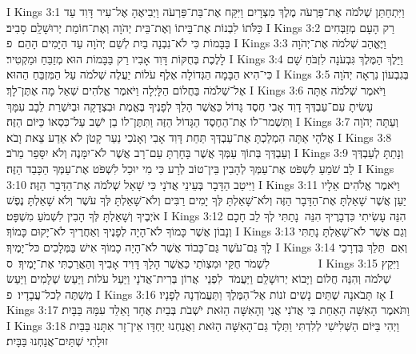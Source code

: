 I Kings 3:1	וַיִּתְחַתֵּן שְׁלֹמֹה אֶת־פַּרְעֹה מֶלֶךְ מִצְרָיִם וַיִּקַּח אֶת־בַּת־פַּרְעֹה וַיְבִיאֶהָ אֶל־עִיר דָּוִד עַד כַּלֹּתוֹ לִבְנוֹת אֶת־בֵּיתוֹ וְאֶת־בֵּית יְהֹוָה וְאֶת־חוֹמַת יְרוּשָׁלַ͏ִם סָבִיב׃
I Kings 3:2	רַק הָעָם מְזַבְּחִים בַּבָּמוֹת כִּי לֹא־נִבְנָה בַיִת לְשֵׁם יְהֹוָה עַד הַיָּמִים הָהֵם׃ {פ}
I Kings 3:3	וַיֶּאֱהַב שְׁלֹמֹה אֶת־יְהֹוָה לָלֶכֶת בְּחֻקּוֹת דָּוִד אָבִיו רַק בַּבָּמוֹת הוּא מְזַבֵּחַ וּמַקְטִיר׃
I Kings 3:4	וַיֵּלֶךְ הַמֶּלֶךְ גִּבְעֹנָה לִזְבֹּחַ שָׁם כִּי־הִיא הַבָּמָה הַגְּדוֹלָה אֶלֶף עֹלוֹת יַעֲלֶה שְׁלֹמֹה עַל הַמִּזְבֵּחַ הַהוּא׃
I Kings 3:5	בְּגִבְעוֹן נִרְאָה יְהֹוָה אֶל־שְׁלֹמֹה בַּחֲלוֹם הַלָּיְלָה וַיֹּאמֶר אֱלֹהִים שְׁאַל מָה אֶתֶּן־לָךְ׃
I Kings 3:6	וַיֹּאמֶר שְׁלֹמֹה אַתָּה עָשִׂיתָ עִם־עַבְדְּךָ דָוִד אָבִי חֶסֶד גָּדוֹל כַּאֲשֶׁר הָלַךְ לְפָנֶיךָ בֶּאֱמֶת וּבִצְדָקָה וּבְיִשְׁרַת לֵבָב עִמָּךְ וַתִּשְׁמר־לוֹ אֶת־הַחֶסֶד הַגָּדוֹל הַזֶּה וַתִּתֶּן־לוֹ בֵן יֹשֵׁב עַל־כִּסְאוֹ כַּיּוֹם הַזֶּה׃
I Kings 3:7	וְעַתָּה יְהֹוָה אֱלֹהָי אַתָּה הִמְלַכְתָּ אֶת־עַבְדְּךָ תַּחַת דָּוִד אָבִי וְאָנֹכִי נַעַר קָטֹן לֹא אֵדַע צֵאת וָבֹא׃
I Kings 3:8	וְעַבְדְּךָ בְּתוֹךְ עַמְּךָ אֲשֶׁר בָּחָרְתָּ עַם־רָב אֲשֶׁר לֹא־יִמָּנֶה וְלֹא יִסָּפֵר מֵרֹב׃
I Kings 3:9	וְנָתַתָּ לְעַבְדְּךָ לֵב שֹׁמֵעַ לִשְׁפֹּט אֶת־עַמְּךָ לְהָבִין בֵּין־טוֹב לְרָע כִּי מִי יוּכַל לִשְׁפֹּט אֶת־עַמְּךָ הַכָּבֵד הַזֶּה׃
I Kings 3:10	וַיִּיטַב הַדָּבָר בְּעֵינֵי אֲדֹנָי כִּי שָׁאַל שְׁלֹמֹה אֶת־הַדָּבָר הַזֶּה׃
I Kings 3:11	וַיֹּאמֶר אֱלֹהִים אֵלָיו יַעַן אֲשֶׁר שָׁאַלְתָּ אֶת־הַדָּבָר הַזֶּה וְלֹא־שָׁאַלְתָּ לְּךָ יָמִים רַבִּים וְלֹא־שָׁאַלְתָּ לְּךָ עֹשֶׁר וְלֹא שָׁאַלְתָּ נֶפֶשׁ אֹיְבֶיךָ וְשָׁאַלְתָּ לְּךָ הָבִין לִשְׁמֹעַ מִשְׁפָּט׃
I Kings 3:12	הִנֵּה עָשִׂיתִי כִּדְבָרֶיךָ הִנֵּה  נָתַתִּי לְךָ לֵב חָכָם וְנָבוֹן אֲשֶׁר כָּמוֹךָ לֹא־הָיָה לְפָנֶיךָ וְאַחֲרֶיךָ לֹא־יָקוּם כָּמוֹךָ׃
I Kings 3:13	וְגַם אֲשֶׁר לֹא־שָׁאַלְתָּ נָתַתִּי לָךְ גַּם־עֹשֶׁר גַּם־כָּבוֹד אֲשֶׁר לֹא־הָיָה כָמוֹךָ אִישׁ בַּמְּלָכִים כּל־יָמֶיךָ׃
I Kings 3:14	וְאִם  תֵּלֵךְ בִּדְרָכַי לִשְׁמֹר חֻקַּי וּמִצְוֺתַי כַּאֲשֶׁר הָלַךְ דָּוִיד אָבִיךָ וְהַאֲרַכְתִּי אֶת־יָמֶיךָ׃ {ס}        
I Kings 3:15	וַיִּקַץ שְׁלֹמֹה וְהִנֵּה חֲלוֹם וַיָּבוֹא יְרוּשָׁלַ͏ִם וַיַּעֲמֹד  לִפְנֵי  אֲרוֹן בְּרִית־אֲדֹנָי וַיַּעַל עֹלוֹת וַיַּעַשׂ שְׁלָמִים וַיַּעַשׂ מִשְׁתֶּה לְכל־עֲבָדָיו׃ {פ}
I Kings 3:16	אָז תָּבֹאנָה שְׁתַּיִם נָשִׁים זֹנוֹת אֶל־הַמֶּלֶךְ וַתַּעֲמֹדְנָה לְפָנָיו׃
I Kings 3:17	וַתֹּאמֶר הָאִשָּׁה הָאַחַת בִּי אֲדֹנִי אֲנִי וְהָאִשָּׁה הַזֹּאת יֹשְׁבֹת בְּבַיִת אֶחָד וָאֵלֵד עִמָּהּ בַּבָּיִת׃
I Kings 3:18	וַיְהִי בַּיּוֹם הַשְּׁלִישִׁי לְלִדְתִּי וַתֵּלֶד גַּם־הָאִשָּׁה הַזֹּאת וַאֲנַחְנוּ יַחְדָּו אֵין־זָר אִתָּנוּ בַּבַּיִת זוּלָתִי שְׁתַּיִם־אֲנַחְנוּ בַּבָּיִת׃
